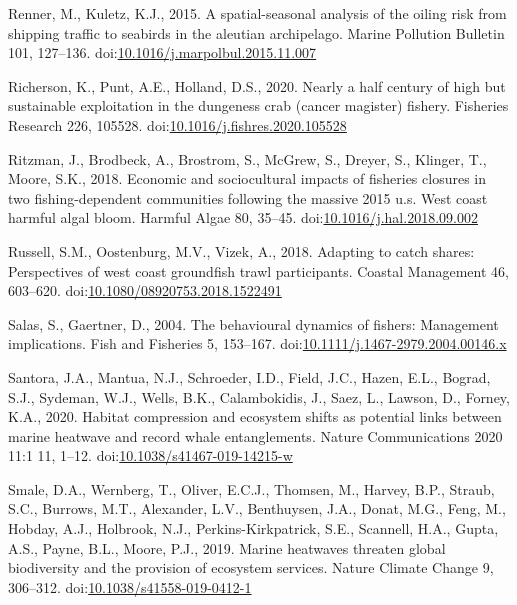 \documentclass[]{elsarticle} %
\begin{document}
\leavevmode\hypertarget{ref-Renner2015}{}%
Renner, M., Kuletz, K.J., 2015. A spatial-seasonal analysis of the
oiling risk from shipping traffic to seabirds in the aleutian
archipelago. Marine Pollution Bulletin 101, 127--136.
doi:\href{https://doi.org/10.1016/j.marpolbul.2015.11.007}{10.1016/j.marpolbul.2015.11.007}

\leavevmode\hypertarget{ref-Richerson2020}{}%
Richerson, K., Punt, A.E., Holland, D.S., 2020. Nearly a half century of
high but sustainable exploitation in the dungeness crab (cancer
magister) fishery. Fisheries Research 226, 105528.
doi:\href{https://doi.org/10.1016/j.fishres.2020.105528}{10.1016/j.fishres.2020.105528}

\leavevmode\hypertarget{ref-Ritzman2018}{}%
Ritzman, J., Brodbeck, A., Brostrom, S., McGrew, S., Dreyer, S.,
Klinger, T., Moore, S.K., 2018. Economic and sociocultural impacts of
fisheries closures in two fishing-dependent communities following the
massive 2015 u.s. West coast harmful algal bloom. Harmful Algae 80,
35--45.
doi:\href{https://doi.org/10.1016/j.hal.2018.09.002}{10.1016/j.hal.2018.09.002}

\leavevmode\hypertarget{ref-Russell2018}{}%
Russell, S.M., Oostenburg, M.V., Vizek, A., 2018. Adapting to catch
shares: Perspectives of west coast groundfish trawl participants.
Coastal Management 46, 603--620.
doi:\href{https://doi.org/10.1080/08920753.2018.1522491}{10.1080/08920753.2018.1522491}

\leavevmode\hypertarget{ref-Salas2004a}{}%
Salas, S., Gaertner, D., 2004. The behavioural dynamics of fishers:
Management implications. Fish and Fisheries 5, 153--167.
doi:\href{https://doi.org/10.1111/j.1467-2979.2004.00146.x}{10.1111/j.1467-2979.2004.00146.x}

\leavevmode\hypertarget{ref-Santora2020}{}%
Santora, J.A., Mantua, N.J., Schroeder, I.D., Field, J.C., Hazen, E.L.,
Bograd, S.J., Sydeman, W.J., Wells, B.K., Calambokidis, J., Saez, L.,
Lawson, D., Forney, K.A., 2020. Habitat compression and ecosystem shifts
as potential links between marine heatwave and record whale
entanglements. Nature Communications 2020 11:1 11, 1--12.
doi:\href{https://doi.org/10.1038/s41467-019-14215-w}{10.1038/s41467-019-14215-w}

\leavevmode\hypertarget{ref-Smale2019}{}%
Smale, D.A., Wernberg, T., Oliver, E.C.J., Thomsen, M., Harvey, B.P.,
Straub, S.C., Burrows, M.T., Alexander, L.V., Benthuysen, J.A., Donat,
M.G., Feng, M., Hobday, A.J., Holbrook, N.J., Perkins-Kirkpatrick, S.E.,
Scannell, H.A., Gupta, A.S., Payne, B.L., Moore, P.J., 2019. Marine
heatwaves threaten global biodiversity and the provision of ecosystem
services. Nature Climate Change 9, 306--312.
doi:\href{https://doi.org/10.1038/s41558-019-0412-1}{10.1038/s41558-019-0412-1}
\end{document}

